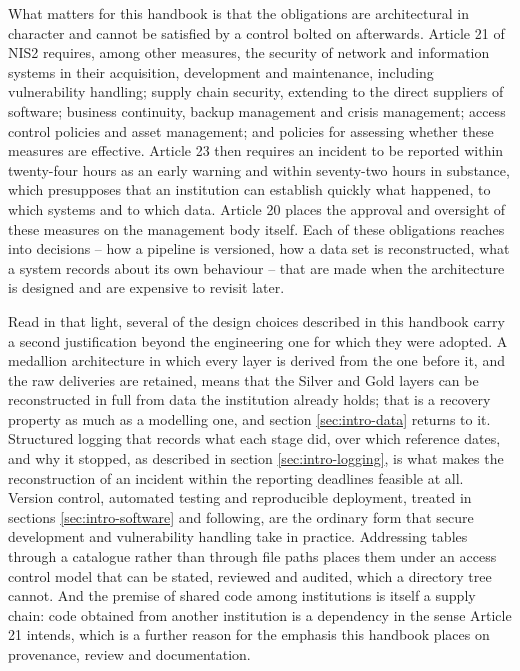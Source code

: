 \documentclass[a4paper, 11pt]{report}
\begin{document}
What matters for this handbook is that the obligations are architectural in character and cannot be satisfied by a control bolted on afterwards. Article 21 of NIS2 requires, among other measures, the security of network and information systems in their acquisition, development and maintenance, including vulnerability handling; supply chain security, extending to the direct suppliers of software; business continuity, backup management and crisis management; access control policies and asset management; and policies for assessing whether these measures are effective. Article 23 then requires an incident to be reported within twenty-four hours as an early warning and within seventy-two hours in substance, which presupposes that an institution can establish quickly what happened, to which systems and to which data. Article 20 places the approval and oversight of these measures on the management body itself. Each of these obligations reaches into decisions -- how a pipeline is versioned, how a data set is reconstructed, what a system records about its own behaviour -- that are made when the architecture is designed and are expensive to revisit later.

Read in that light, several of the design choices described in this handbook carry a second justification beyond the engineering one for which they were adopted. A medallion architecture in which every layer is derived from the one before it, and the raw deliveries are retained, means that the Silver and Gold layers can be reconstructed in full from data the institution already holds; that is a recovery property as much as a modelling one, and section \ref{sec:intro-data} returns to it. Structured logging that records what each stage did, over which reference dates, and why it stopped, as described in section \ref{sec:intro-logging}, is what makes the reconstruction of an incident within the reporting deadlines feasible at all. Version control, automated testing and reproducible deployment, treated in sections \ref{sec:intro-software} and following, are the ordinary form that secure development and vulnerability handling take in practice. Addressing tables through a catalogue rather than through file paths places them under an access control model that can be stated, reviewed and audited, which a directory tree cannot. And the premise of shared code among institutions is itself a supply chain: code obtained from another institution is a dependency in the sense Article 21 intends, which is a further reason for the emphasis this handbook places on provenance, review and documentation.
\end{document}

